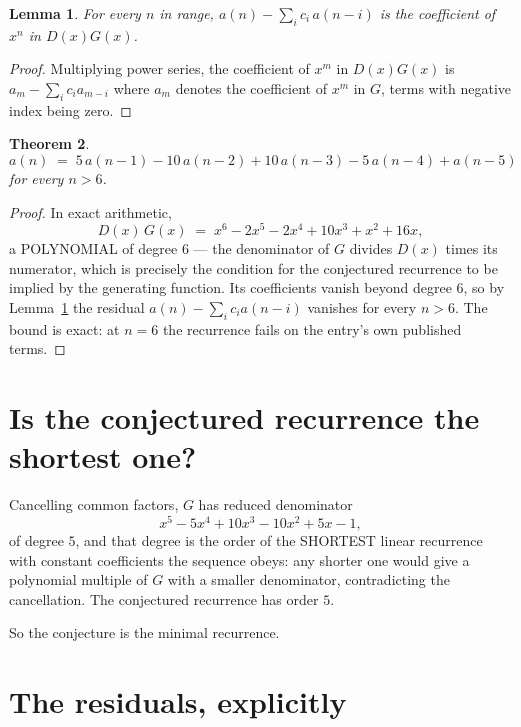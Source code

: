 \documentclass[11pt,a4paper]{article}
\theoremstyle{plain}
\newtheorem{theorem}{Theorem}
\newtheorem{lemma}[theorem]{Lemma}
\theoremstyle{definition}
\begin{document}
\begin{lemma}\label{lem:key}
For every $n$ in range, $a(n)-\sum_i c_i\,a(n-i)$ is the coefficient of $x^{n}$ in
$D(x)G(x)$.
\end{lemma}

\begin{proof}
Multiplying power series, the coefficient of $x^{m}$ in $D(x)G(x)$ is
$a_m-\sum_i c_i a_{m-i}$ where $a_m$ denotes the coefficient of $x^{m}$ in $G$, terms with
negative index being zero.
\end{proof}

\begin{theorem}
\[
a(n)\;=\;5\,a(n-1) - 10\,a(n-2) + 10\,a(n-3) - 5\,a(n-4) + a(n-5)
\]
for every $n>6$.
\end{theorem}

\begin{proof}
In exact arithmetic,
\[
D(x)\,G(x)\;=\;x^{6} - 2 x^{5} - 2 x^{4} + 10 x^{3} + x^{2} + 16 x,
\]
a POLYNOMIAL of degree $6$ --- the denominator of $G$ divides $D(x)$ times its numerator,
which is precisely the condition for the conjectured recurrence to be implied by the
generating function. Its coefficients vanish beyond degree $6$, so by
Lemma~\ref{lem:key} the residual $a(n)-\sum_ic_ia(n-i)$ vanishes for every
$n>6$. The bound is exact: at $n=6$ the recurrence fails on the entry's own published terms.
\end{proof}

\section{Is the conjectured recurrence the shortest one?}

Cancelling common factors, $G$ has reduced denominator
\[
x^{5} - 5 x^{4} + 10 x^{3} - 10 x^{2} + 5 x - 1,
\]
of degree $5$, and that degree is the order of the SHORTEST linear recurrence with
constant coefficients the sequence obeys: any shorter one would give a polynomial multiple of
$G$ with a smaller denominator, contradicting the cancellation. The conjectured recurrence has
order $5$.

So the conjecture is the minimal recurrence.

\section{The residuals, explicitly}
\end{document}
